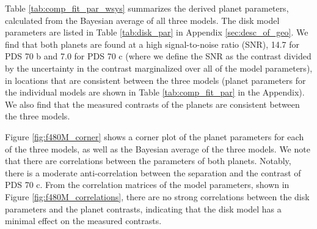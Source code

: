 \documentclass[11pt,twocolumn,twocolappendix]{aastex631}
\newcommand{\db}[1]{\textcolor{red}{#1}}
\begin{document}
Table \ref{tab:comp_fit_par_wsys} summarizes the derived planet parameters, calculated from the Bayesian average of all three models. The disk model parameters are listed in Table \ref{tab:disk_par} in Appendix \ref{sec:desc_of_geo}. {We find that both planets are found at a high signal-to-noise ratio (SNR), 14.7 for PDS 70 b and 7.0 for PDS 70 c (where we define the SNR as the contrast divided by the uncertainty in the contrast marginalized over all of the model parameters), in locations that are consistent between the three models (planet parameters for the individual models are shown in Table \ref{tab:comp_fit_par} in the Appendix). We also find that the measured contrasts of the planets are consistent between the three models.} %

{Figure \ref{fig:f480M_corner} shows a corner plot of the planet parameters for each of the three models, as well as the Bayesian average of the three models. We note that there are correlations between the parameters of both planets. Notably, there is a moderate anti-correlation between the separation and the contrast of PDS 70 c. From the correlation matrices of the model parameters, shown in Figure \ref{fig:f480M_correlations}, there are no strong correlations between the disk parameters and the planet contrasts, indicating that the disk model has a minimal effect on the measured contrasts.}
\end{document}
